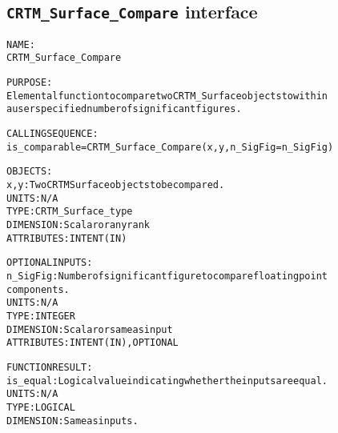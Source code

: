 \subsection{\texttt{CRTM\_Surface\_Compare} interface}
  \label{sec:CRTM_Surface_Compare_interface}
  \begin{alltt}
  NAME:
        CRTM_Surface_Compare
 
  PURPOSE:
        Elemental function to compare two CRTM_Surface objects to within
        a user specified number of significant figures.
 
  CALLING SEQUENCE:
        is_comparable = CRTM_Surface_Compare( x, y, n_SigFig=n_SigFig )
 
  OBJECTS:
        x, y:          Two CRTM Surface objects to be compared.
                       UNITS:      N/A
                       TYPE:       CRTM_Surface_type
                       DIMENSION:  Scalar or any rank
                       ATTRIBUTES: INTENT(IN)
 
  OPTIONAL INPUTS:
        n_SigFig:      Number of significant figure to compare floating point
                       components.
                       UNITS:      N/A
                       TYPE:       INTEGER
                       DIMENSION:  Scalar or same as input
                       ATTRIBUTES: INTENT(IN), OPTIONAL
 
  FUNCTION RESULT:
        is_equal:      Logical value indicating whether the inputs are equal.
                       UNITS:      N/A
                       TYPE:       LOGICAL
                       DIMENSION:  Same as inputs.
  \end{alltt}
